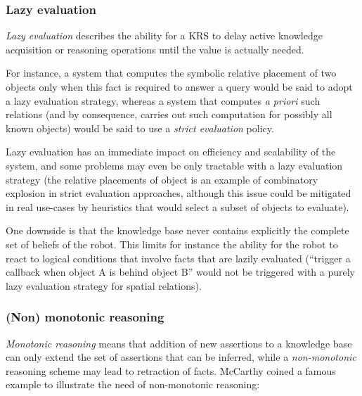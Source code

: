 \subsubsection{Lazy evaluation}
\label{sect|lazy-evaluation}

\emph{Lazy evaluation} describes the ability for a KRS to delay active
knowledge acquisition or reasoning operations until the value is actually
needed.

For instance, a system that computes the symbolic relative placement of two
objects only when this fact is required to answer a query would be said to
adopt a lazy evaluation strategy, whereas a system that computes {\it a priori}
such relations (and by consequence, carries out such computation for possibly
all known objects) would be said to use a \emph{strict evaluation} policy.

Lazy evaluation has an immediate impact on efficiency and scalability of the
system, and some problems may even be only tractable with a lazy evaluation
strategy (the relative placements of object is an example of combinatory
explosion in strict evaluation approaches, although this issue could be
mitigated in real use-cases by heuristics that would select a subset of objects
to evaluate).

One downside is that the knowledge base never contains explicitly the complete
set of beliefs of the robot. This limits for instance the ability for the robot
to react to logical conditions that involve facts that are lazily evaluated
(``trigger a callback when object A is behind object B'' would not be triggered
with a purely lazy evaluation strategy for spatial relations).


\subsubsection{(Non) monotonic reasoning}

\emph{Monotonic reasoning} means that addition of new assertions to a knowledge base
can only extend the set of assertions that can be inferred, while a
\emph{non-monotonic} reasoning scheme may lead to retraction of facts.
McCarthy coined a famous example to illustrate the need of non-monotonic reasoning:

